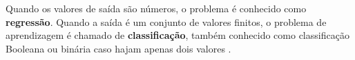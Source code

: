 Quando os valores de saída são números, o problema é conhecido como \textbf{regressão}. Quando a saída é um conjunto de valores finitos, o problema de aprendizagem é chamado de \textbf{classificação}, também conhecido como classificação Booleana ou binária caso hajam apenas dois valores \cite{russell:2010}.







